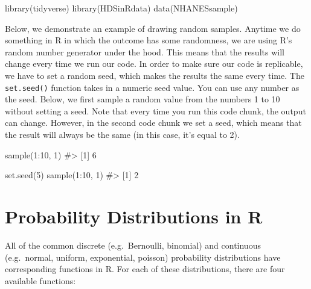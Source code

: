 \documentclass[
  letterpaper,
]{krantz}
\makeatletter
\newenvironment{Shaded}{\begin{snugshade}}{\end{snugshade}}
\newcommand{\CommentTok}[1]{\textcolor[rgb]{0.37,0.37,0.37}{#1}}
\newcommand{\DecValTok}[1]{\textcolor[rgb]{0.68,0.00,0.00}{#1}}
\newcommand{\FunctionTok}[1]{\textcolor[rgb]{0.28,0.35,0.67}{#1}}
\newcommand{\NormalTok}[1]{\textcolor[rgb]{0.00,0.23,0.31}{#1}}
\newcommand{\SpecialCharTok}[1]{\textcolor[rgb]{0.37,0.37,0.37}{#1}}
\newenvironment{kframe}{%
\medskip{}
\setlength{\fboxsep}{.8em}
 \def\at@end@of@kframe{}%
 \ifinner\ifhmode%
  \def\at@end@of@kframe{\end{minipage}}%
  \begin{minipage}{\columnwidth}%
 \fi\fi%
 \def\FrameCommand##1{\hskip\@totalleftmargin \hskip-\fboxsep
 \colorbox{shadecolor}{##1}\hskip-\fboxsep
     \hskip-\linewidth \hskip-\@totalleftmargin \hskip\columnwidth}%
 \MakeFramed {\advance\hsize-\width
   \@totalleftmargin\z@ \linewidth\hsize
   \@setminipage}}%
 {\par\unskip\endMakeFramed%
 \at@end@of@kframe}
\renewenvironment{Shaded}{\begin{kframe}}{\end{kframe}}
\makeatother
\begin{document}
\begin{Shaded}
\begin{Highlighting}[]
\FunctionTok{library}\NormalTok{(tidyverse)}
\FunctionTok{library}\NormalTok{(HDSinRdata)}
\FunctionTok{data}\NormalTok{(NHANESsample)}
\end{Highlighting}
\end{Shaded}

Below, we demonstrate an example of drawing random samples. Anytime we
do something in R in which the outcome has some randomness, we are using
R's random number generator under the hood. This means that the results
will change every time we run our code. In order to make sure our code
is replicable, we have to set a random seed, which makes the results the
same every time. The \texttt{set.seed()} function takes in a numeric
seed value. You can use any number as the seed. Below, we first sample a
random value from the numbers 1 to 10 without setting a seed. Note that
every time you run this code chunk, the output can change. However, in
the second code chunk we set a seed, which means that the result will
always be the same (in this case, it's equal to 2).

\begin{Shaded}
\begin{Highlighting}[]
\FunctionTok{sample}\NormalTok{(}\DecValTok{1}\SpecialCharTok{:}\DecValTok{10}\NormalTok{, }\DecValTok{1}\NormalTok{)}
\CommentTok{\#\textgreater{} [1] 6}
\end{Highlighting}
\end{Shaded}

\begin{Shaded}
\begin{Highlighting}[]
\FunctionTok{set.seed}\NormalTok{(}\DecValTok{5}\NormalTok{)}
\FunctionTok{sample}\NormalTok{(}\DecValTok{1}\SpecialCharTok{:}\DecValTok{10}\NormalTok{, }\DecValTok{1}\NormalTok{)}
\CommentTok{\#\textgreater{} [1] 2}
\end{Highlighting}
\end{Shaded}

\section{Probability Distributions in
R}\label{probability-distributions-in-r}

All of the common discrete (e.g.~Bernoulli, binomial) and continuous
(e.g.~normal, uniform, exponential, poisson) probability distributions
have corresponding functions in R. For each of these distributions,
there are four available functions:
\end{document}
